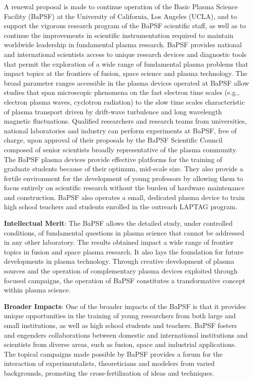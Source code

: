 \documentclass[11pt]{article}
\date{}
\title{}
\begin{document}
A renewal proposal is made to continue operation of the Basic Plasma
Science Facility (BaPSF) at the University of California, Los Angeles
(UCLA), and to support the vigorous research program of the BaPSF
scientific staff, as well as to continue the improvements in
scientific instrumentation required to maintain worldwide leadership
in fundamental plasma research. BaPSF provides national and
international scientists access to unique research devices and
diagnostic tools that permit the exploration of a wide range of
fundamental plasma problems that impact topics at the frontiers of
fusion, space science and plasma technology. The broad parameter
ranges accessible in the plasma devices operated at BaPSF allow
studies that span microscopic phenomena on the fast electron time
scales (e.g., electron plasma waves, cyclotron radiation) to the slow
time scales characteristic of plasma transport driven by drift-wave
turbulence and long wavelength magnetic fluctuations.  Qualified
researchers and research teams from universities, national
laboratories and industry can perform experiments at BaPSF, free of
charge, upon approval of their proposals by the BaPSF Scientific
Council composed of senior scientists broadly representative of the
plasma community. The BaPSF plasma devices provide effective platforms
for the training of graduate students because of their optimum,
mid-scale size. They also provide a fertile environment for the
development of young professors by allowing them to focus entirely on
scientific research without the burden of hardware maintenance and
construction. BaPSF also operates a small, dedicated plasma device to
train high school teachers and students enrolled in the outreach
LAPTAG program.  

{\bfseries Intellectual Merit}:  The BaPSF allows the detailed
study, under controlled conditions, of fundamental questions in plasma
science that cannot be addressed in any other laboratory. The results
obtained impact a wide range of frontier topics in fusion and space
plasma research. It also lays the foundation for future developments
in plasma technology. Through creative development of plasma sources
and the operation of complementary plasma devices exploited through
focused campaigns, the operation of BaPSF constitutes a transformative
concept within plasma science.  

{\bfseries Broader Impacts}:  One of the broader
impacts of the BaPSF is that it provides unique opportunities in the
training of young researchers from both large and small institutions,
as well as high school students and teachers. BaPSF fosters and
engenders collaborations between domestic and international
institutions and scientists from diverse areas, such as fusion, space
and industrial applications. The topical campaigns made possible by
BaPSF provides a forum for the interaction of experimentalists,
theoreticians and modelers from varied backgrounds, promoting the
cross-fertilization of ideas and techniques.
\end{document}
